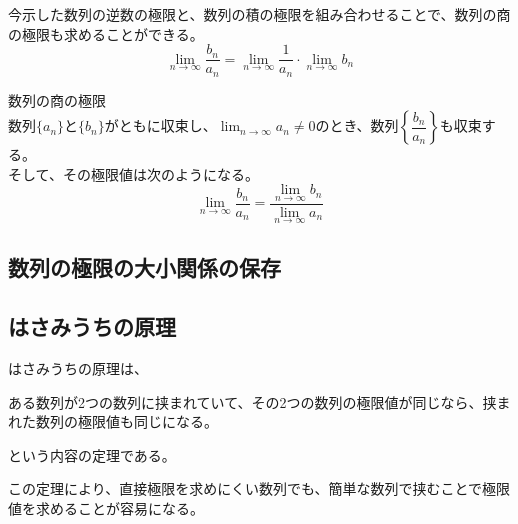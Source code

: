 \documentclass[../../math-imaging]{subfiles}
\begin{document}
今示した数列の逆数の極限と、数列の積の極限を組み合わせることで、数列の商の極限も求めることができる。
\begin{equation*}
  \lim_{n \to \infty} \dfrac{b_n}{a_n} = \lim_{n\to\infty}\dfrac{1}{a_n} \cdot \lim_{n\to\infty} b_n
\end{equation*}

\begin{theorem}{数列の商の極限}\quad\\
  数列$\{a_n\}$と$\{b_n\}$がともに収束し、$\displaystyle\lim_{n \to \infty} a_n \neq 0$のとき、数列$\left\{\dfrac{b_n}{a_n}\right\}$も収束する。\\
  そして、その極限値は次のようになる。
  \LARGE
  \begin{equation}
    \lim_{n \to \infty} \dfrac{b_n}{a_n} = \dfrac{\displaystyle\lim_{n \to \infty} b_n}{\displaystyle\lim_{n \to \infty} a_n}
  \end{equation}
\end{theorem}

\subsection{数列の極限の大小関係の保存}


\subsection{はさみうちの原理}

はさみうちの原理は、

\begin{emphabox}
  ある数列が2つの数列に挟まれていて、その2つの数列の極限値が同じなら、挟まれた数列の極限値も同じになる。
\end{emphabox}

という内容の定理である。

この定理により、直接極限を求めにくい数列でも、簡単な数列で挟むことで極限値を求めることが容易になる。
\end{document}
